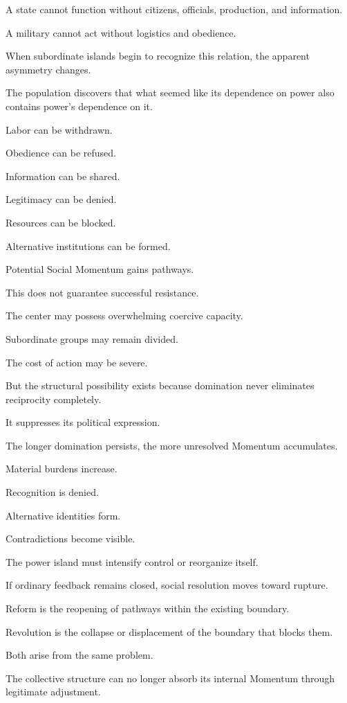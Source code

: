 A state cannot function without citizens, officials, production, and information.

A military cannot act without logistics and obedience.

When subordinate islands begin to recognize this relation, the apparent asymmetry changes.

The population discovers that what seemed like its dependence on power also contains power’s dependence on it.

Labor can be withdrawn.

Obedience can be refused.

Information can be shared.

Legitimacy can be denied.

Resources can be blocked.

Alternative institutions can be formed.

Potential Social Momentum gains pathways.

This does not guarantee successful resistance.

The center may possess overwhelming coercive capacity.

Subordinate groups may remain divided.

The cost of action may be severe.

But the structural possibility exists because domination never eliminates reciprocity completely.

It suppresses its political expression.

The longer domination persists, the more unresolved Momentum accumulates.

Material burdens increase.

Recognition is denied.

Alternative identities form.

Contradictions become visible.

The power island must intensify control or reorganize itself.

If ordinary feedback remains closed, social resolution moves toward rupture.

Reform is the reopening of pathways within the existing boundary.

Revolution is the collapse or displacement of the boundary that blocks them.

Both arise from the same problem.

The collective structure can no longer absorb its internal Momentum through legitimate adjustment.

